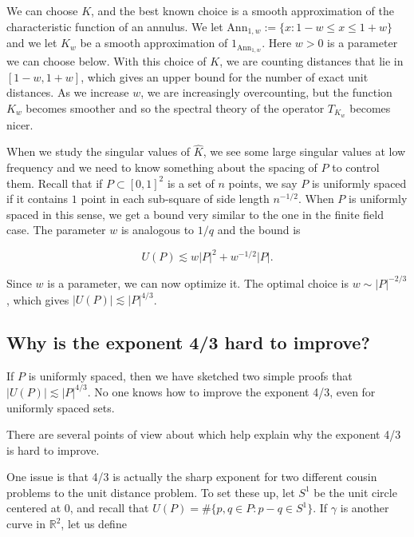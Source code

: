 \documentclass{amsart}
\newcommand{\RR}{\mathbb{R}}
\newcommand{\Ann}{\textrm{Ann}}
\begin{document}
We can choose $K$, and the best known choice is a smooth approximation of the characteristic function of an annulus.  We let $\Ann_{1, w}:= \{ x: 1-w \le x \le 1+w \}$ and we let $K_w$ be a smooth approximation of $1_{\Ann_{1,w}}$.  Here $w > 0$ is a parameter we can choose below.  With this choice of $K$,  we are counting distances that lie in $[1-w, 1+w]$, which gives an upper bound for the number of exact unit distances.  As we increase $w$, we are increasingly overcounting, but the function $K_w$ becomes smoother and so the spectral theory of the operator $T_{K_w}$ becomes nicer.

When we study the singular values of $\hat K$, we see some large singular values at low frequency and we need to know something about the spacing of $P$ to control them.  Recall that if $P \subset [0,1]^2$ is a set of $n$ points, we say $P$ is uniformly spaced if it contains $1$ point in each sub-square of side length $n^{-1/2}$.  When $P$ is uniformly spaced in this sense, we get a bound very similar to the one in the finite field case.  The parameter $w$ is analogous to $1/q$ and the bound is 

\begin{equation} \label{specbound2}
U(P) \lesssim w |P|^2 + w^{-1/2} |P|. 
\end{equation}

Since $w$ is a parameter, we can now optimize it.  The optimal choice is $w \sim |P|^{-2/3}$, which gives $|U(P)| \lesssim |P|^{4/3}$.  



\subsection{Why is the exponent 4/3 hard to improve?}


If $P$ is uniformly spaced, then we have sketched two simple proofs that $|U(P)| \lesssim |P|^{4/3}$.  No one knows how to improve the exponent 4/3, even for uniformly spaced sets.

There are several points of view about which help explain why the exponent 4/3 is hard to improve.

One issue is that 4/3 is actually the sharp exponent for two different cousin problems to the unit distance problem.  To set these up, let $S^1$ be the unit circle centered at 0, and recall that $U(P) = \# \{ p, q \in P : p-q \in S^1 \}$.   If $\gamma$ is another curve in $\RR^2$, let us define
\end{document}
